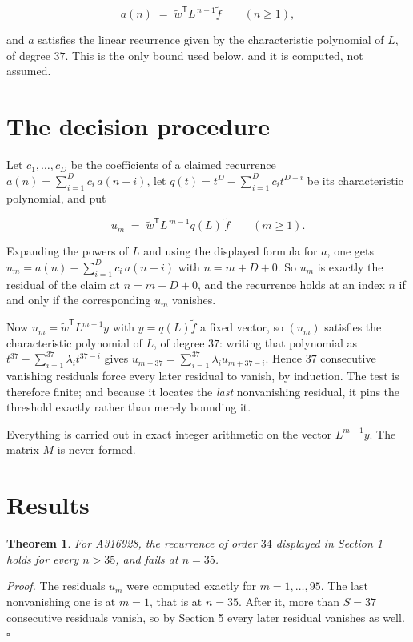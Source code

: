 \documentclass[11pt]{article}
\newtheorem{theorem}{Theorem}
\theoremstyle{definition}
\begin{document}
\[a(n) \;=\; \tilde w^{\mathsf T} L^{\,n-1} \tilde f \qquad (n \ge 1),\]

and $a$ satisfies the linear recurrence given by the characteristic polynomial of $L$, of degree $37$. This is the only bound used below, and it is computed, not assumed.

\section{The decision procedure}

Let $c_1,\dots,c_D$ be the coefficients of a claimed recurrence $a(n) = \sum_{i=1}^{D} c_i\,a(n-i)$, let $q(t) = t^{D} - \sum_{i=1}^{D} c_i t^{D-i}$ be its characteristic polynomial, and put

\[u_m \;=\; \tilde w^{\mathsf T} L^{\,m-1} q(L)\,\tilde f \qquad (m \ge 1).\]

Expanding the powers of $L$ and using the displayed formula for $a$, one gets $u_m = a(n) - \sum_{i=1}^{D} c_i\,a(n-i)$ with $n = m + D + 0$. So $u_m$ is exactly the residual of the claim at $n = m + D + 0$, and the recurrence holds at an index $n$ if and only if the corresponding $u_m$ vanishes.

Now $u_m = \tilde w^{\mathsf T} L^{m-1} y$ with $y = q(L)\tilde f$ a fixed vector, so $(u_m)$ satisfies the characteristic polynomial of $L$, of degree $37$: writing that polynomial as $t^{37} - \sum_{i=1}^{37} \lambda_i t^{37-i}$ gives $u_{m+37} = \sum_{i=1}^{37} \lambda_i u_{m+37-i}$. Hence $37$ consecutive vanishing residuals force every later residual to vanish, by induction. The test is therefore finite; and because it locates the {\itshape last} nonvanishing residual, it pins the threshold exactly rather than merely bounding it.

Everything is carried out in exact integer arithmetic on the vector $L^{m-1}y$. The matrix $M$ is never formed.

\section{Results}

\begin{theorem} For A316928, the recurrence of order $34$ displayed in Section 1 holds for every $n > 35$, and fails at $n = 35$.\end{theorem}

{\itshape Proof.} The residuals $u_m$ were computed exactly for $m = 1,\dots,95$. The last nonvanishing one is at $m = 1$, that is at $n = 35$. After it, more than $S = 37$ consecutive residuals vanish, so by Section 5 every later residual vanishes as well. $\square$
\end{document}
